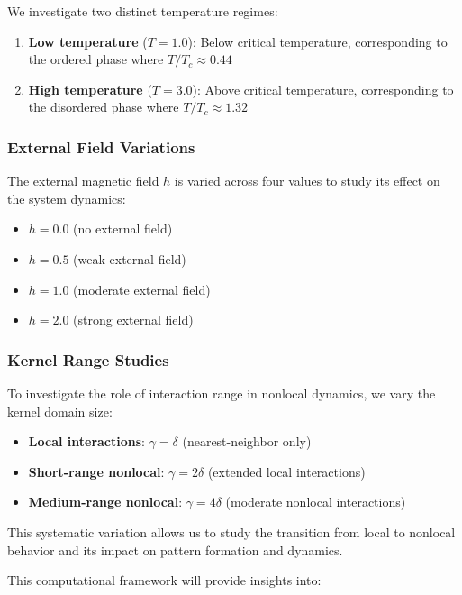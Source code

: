 \documentclass[11pt,a4paper]{article}
\begin{document}
We investigate two distinct temperature regimes:

\begin{enumerate}
    \item \textbf{Low temperature} ($T = 1.0$): Below critical temperature, corresponding to the ordered phase where $T/T_c \approx 0.44$
    \item \textbf{High temperature} ($T = 3.0$): Above critical temperature, corresponding to the disordered phase where $T/T_c \approx 1.32$
\end{enumerate}

\subsubsection{External Field Variations}

The external magnetic field $h$ is varied across four values to study its effect on the system dynamics:

\begin{itemize}
    \item $h = 0.0$ (no external field)
    \item $h = 0.5$ (weak external field)
    \item $h = 1.0$ (moderate external field)
    \item $h = 2.0$ (strong external field)
\end{itemize}

\subsubsection{Kernel Range Studies}

To investigate the role of interaction range in nonlocal dynamics, we vary the kernel domain size:

\begin{itemize}
    \item \textbf{Local interactions}: $\gamma = \delta$ (nearest-neighbor only)
    \item \textbf{Short-range nonlocal}: $\gamma = 2\delta$ (extended local interactions)
    \item \textbf{Medium-range nonlocal}: $\gamma = 4\delta$ (moderate nonlocal interactions)
\end{itemize}

This systematic variation allows us to study the transition from local to nonlocal behavior and its impact on pattern formation and dynamics.

This computational framework will provide insights into:
\end{document}

